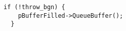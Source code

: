 \begin{lstlisting}[style=C++, caption={Release of the filled Baumer \texttt{Buffer} object}, label=lst:buffer_release]
  if (!throw_bgn) {
    pBufferFilled->QueueBuffer();
  }
\end{lstlisting}








